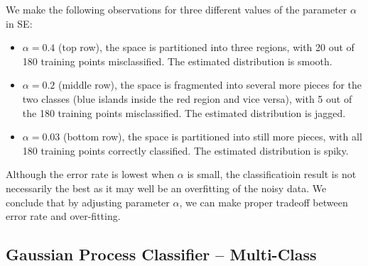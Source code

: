 \documentclass{article}
\begin{document}
We make the following observations for three different values of the
parameter $\alpha$ in SE:
\begin{itemize}
\item $\alpha=0.4$ (top row), the space is partitioned into three regions,
  with 20 out of 180 training points misclassified. The estimated
  distribution is smooth.
\item $\alpha=0.2$ (middle row), the space is fragmented into several 
  more pieces for the two classes (blue islands inside the red region 
  and vice versa), with 5 out of the 180 training points misclassified.
  The estimated distribution is jagged.
\item $\alpha=0.03$ (bottom row), the space is partitioned into still 
  more pieces, with all 180 training points correctly classified. The 
  estimated distribution is spiky. 
\end{itemize}
Although the error rate is lowest when $\alpha$ is small, the classificatioin
result is not necessarily the best as it may well be an overfitting of 
the noisy data. We conclude that by adjusting parameter $\alpha$, we can 
make proper tradeoff between error rate and over-fitting.



\subsection{Gaussian Process Classifier -- Multi-Class}


\end{document}
